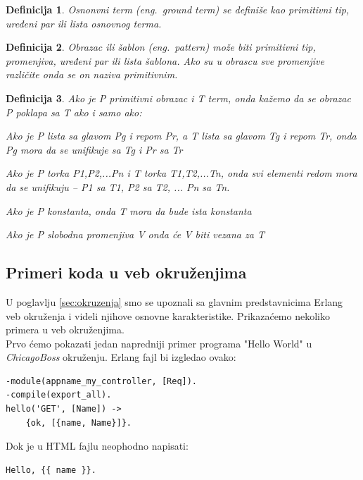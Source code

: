 \documentclass[a4paper]{article}
\newtheorem{definition}{Definicija}
\begin{document}
{\theoremstyle{definition}
\begin{definition}{Osnonvni term (eng.~{\em ground term})}
se definiše kao primitivni tip, uređeni par ili lista osnovnog terma.
\end{definition}

\begin{definition}{Obrazac ili šablon (eng.~{\em pattern})}
može biti primitivni tip, promenjiva, uređeni par ili lista šablona.
Ako su u obrascu sve promenjive različite onda se on naziva primitivnim.
\end{definition}

\begin{definition}{}
Ako je P  primitivni obrazac i T term, onda kažemo da se obrazac P poklapa sa T ako i samo ako:
\begin{list}{•}{}
\item Ako je P lista sa glavom Pg i repom Pr, a T lista sa glavom Tg i repom Tr, onda Pg mora da se unifikuje sa Tg i Pr sa Tr
\item Ako je P torka {P1,P2,...Pn} i T torka {T1,T2,...Tn}, onda svi elementi redom mora da se unifikuju – P1 sa T1, P2 sa T2, ... Pn sa Tn.
\item Ako je P konstanta, onda T mora da bude ista konstanta
\item Ako je P slobodna promenjiva V onda će V biti vezana za T
\end{list}
\end{definition}



\subsection{Primeri koda u veb okruženjima}
\label{sec:dodatak_primeri_okruzenja}

U poglavlju \ref{sec:okruzenja} smo se upoznali sa glavnim predstavnicima Erlang veb okruženja i videli njihove osnovne karakteristike. Prikazaćemo nekoliko primera u veb okruženjima. \\ 

Prvo ćemo pokazati jedan napredniji primer programa "Hello World" u {\em ChicagoBoss} okruženju. Erlang fajl bi izgledao ovako:
\begin{verbatim}
-module(appname_my_controller, [Req]).
-compile(export_all).
hello('GET', [Name]) ->
	{ok, [{name, Name}]}.
\end{verbatim}

Dok je u HTML fajlu neophodno napisati:
\begin{verbatim}
Hello, {{ name }}.
\end{verbatim} 

}
\end{document}
